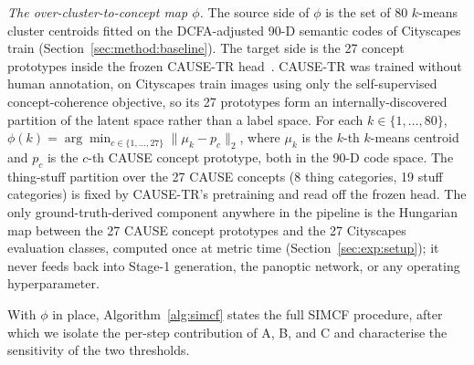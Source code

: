 \documentclass{article}
\renewcommand{\paragraph}[1]{\par\smallskip\noindent\textit{#1}\hspace{0.5em}\ignorespaces}
\begin{document}
\paragraph{The over-cluster-to-concept map $\phi$.}
\label{sec:supp:impl:phi}
The source side of $\phi$ is the set of 80 $k$-means cluster centroids fitted on the DCFA-adjusted 90-D semantic codes of Cityscapes train (Section~\ref{sec:method:baseline}). The target side is the 27 concept prototypes inside the frozen CAUSE-TR head~\cite{kim2024cause}. CAUSE-TR was trained without human annotation, on Cityscapes train images using only the self-supervised concept-coherence objective, so its 27 prototypes form an internally-discovered partition of the latent space rather than a label space. For each $k \in \{1, \dots, 80\}$, $\phi(k) = \arg\min_{c \in \{1, \dots, 27\}} \|\mu_k - p_c\|_2$, where $\mu_k$ is the $k$-th $k$-means centroid and $p_c$ is the $c$-th CAUSE concept prototype, both in the 90-D code space. The thing-stuff partition over the 27 CAUSE concepts (8 thing categories, 19 stuff categories) is fixed by CAUSE-TR's pretraining and read off the frozen head. The only ground-truth-derived component anywhere in the pipeline is the Hungarian map between the 27 CAUSE concept prototypes and the 27 Cityscapes evaluation classes, computed once at metric time (Section~\ref{sec:exp:setup}); it never feeds back into Stage-1 generation, the panoptic network, or any operating hyperparameter.

With $\phi$ in place, Algorithm~\ref{alg:simcf} states the full SIMCF procedure, after which we isolate the per-step contribution of A, B, and C and characterise the sensitivity of the two thresholds.
\end{document}
